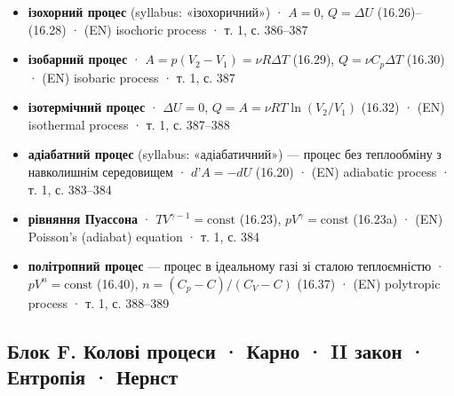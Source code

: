 \documentclass[11pt,a4paper,oneside]{book}
\newcommand{\book}{}
\begin{document}
\begin{itemize}
\item \textbf{ізохорний процес} (syllabus: «ізохоричний») · $A = 0$, $Q = \Delta U$ (16.26)–(16.28) · (EN) isochoric process · \book{} т. 1, с. 386–387
\item \textbf{ізобарний процес} · $A = p(V_2-V_1) = \nu R\Delta T$ (16.29), $Q = \nu C_p\Delta T$ (16.30) · (EN) isobaric process · \book{} т. 1, с. 387
\item \textbf{ізотермічний процес} · $\Delta U = 0$, $Q = A = \nu RT\ln(V_2/V_1)$ (16.32) · (EN) isothermal process · \book{} т. 1, с. 387–388
\item \textbf{адіабатний процес} (syllabus: «адіабатичний») — процес без теплообміну з навколишнім середовищем · $d\text{'}A = -dU$ (16.20) · (EN) adiabatic process · \book{} т. 1, с. 383–384
\item \textbf{рівняння Пуассона} · $TV^{\gamma-1} = \text{const}$ (16.23), $pV^\gamma = \text{const}$ (16.23a) · (EN) Poisson's (adiabat) equation · \book{} т. 1, с. 384
\item \textbf{політропний процес} — процес в ідеальному газі зі сталою теплоємністю · $pV^n = \text{const}$ (16.40), $n = (C_p - C)/(C_V - C)$ (16.37) · (EN) polytropic process · \book{} т. 1, с. 388–389
\end{itemize}

\subsection*{Блок F. Колові процеси · Карно · II закон · Ентропія · Нернст}
\end{document}
